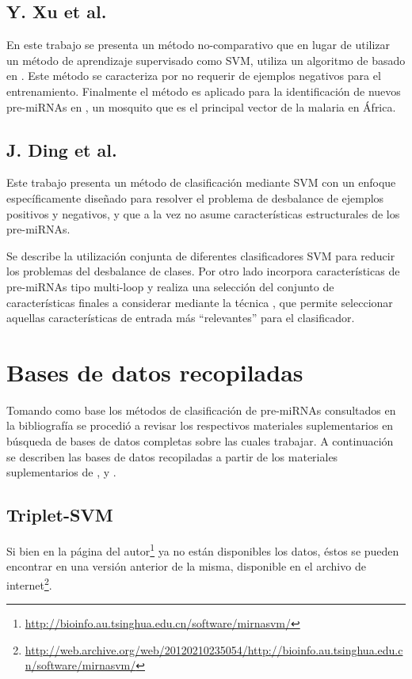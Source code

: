 \documentclass[12pt,bibliography=oldstyle,DIV=12,parskip=half-,titlepage]{scrartcl}
\begin{document}
\subsection{Y. Xu et al. \cite{xu}}
En este trabajo se presenta un método no-comparativo que en lugar de
utilizar un método de aprendizaje supervisado como SVM, utiliza un
algoritmo de  basado en .  Este método
se caracteriza por no requerir de ejemplos negativos para el
entrenamiento. Finalmente el método es aplicado para la identificación
de nuevos pre-miRNAs en , un mosquito que es el
principal vector de la malaria en África.
%
\subsection{J. Ding et al. \cite{ding}}
Este trabajo presenta un método de clasificación mediante SVM con un
enfoque específicamente diseñado para resolver el problema de
desbalance de ejemplos positivos y negativos, y que a la vez no asume
características estructurales de los pre-miRNAs.

Se describe la utilización conjunta de diferentes clasificadores SVM
para reducir los problemas del desbalance de clases. Por otro lado
incorpora características de pre-miRNAs tipo multi-loop y realiza una
selección del conjunto de características finales a considerar
mediante la técnica , que permite seleccionar aquellas
características de entrada más ``relevantes'' para el clasificador.
%
%
%
%
\section{Bases de datos recopiladas}
%
Tomando como base los métodos de clasificación de pre-miRNAs
consultados en la bibliografía se procedió a revisar los respectivos
materiales suplementarios en búsqueda de bases de datos completas
sobre las cuales trabajar.  A continuación se describen las bases de
datos recopiladas a partir de los materiales suplementarios de
\cite{xue}, \cite{ng} y \cite{batuwita}.
%
\subsection{Triplet-SVM \cite{xue}}
%
Si bien en la página del
autor\footnote{\url{http://bioinfo.au.tsinghua.edu.cn/software/mirnasvm/}}
ya no están disponibles los datos, éstos se pueden encontrar en una
versión anterior de la misma, disponible en el archivo de
internet\footnote{\url{http://web.archive.org/web/20120210235054/http://bioinfo.au.tsinghua.edu.cn/software/mirnasvm/}}.
%
\end{document}
